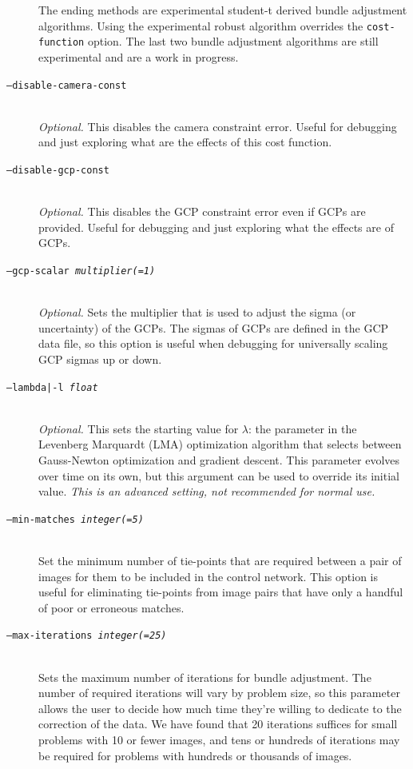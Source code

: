\begin{description}
  The ending methods are experimental student-t derived bundle
  adjustment algorithms. Using the experimental robust algorithm
  overrides the {\tt cost-function} option. The last two bundle
  adjustment algorithms are still experimental and are a work in
  progress.

\item[\texttt{--disable-camera-const}] \hfill \\
  \emph{Optional.} This disables the camera constraint error. Useful
  for debugging and just exploring what are the effects of this cost
  function.

\item[\texttt{--disable-gcp-const}] \hfill \\
  \emph{Optional.} This disables the \ac{GCP} constraint error even
  if \acp{GCP} are provided. Useful for debugging and just exploring
  what the effects are of \acp{GCP}.

\item[\texttt{--gcp-scalar \textit{multiplier(=1)}}] \hfill \\
  \emph{Optional.} Sets the multiplier that is used to adjust the
  sigma (or uncertainty) of the \aclp{GCP}. The sigmas of
  \aclp{GCP} are defined in the \ac{GCP} data file, so this
  option is useful when debugging for universally scaling \ac{GCP} sigmas
  up or down.

\item[\texttt{--lambda|-l \textit{float}}] \hfill \\
  \emph{Optional.} This sets the starting value for $\lambda$: the
  parameter in the Levenberg Marquardt (LMA) optimization algorithm
  that selects between Gauss-Newton optimization and gradient
  descent. This parameter evolves over time on its own, but this
  argument can be used to override its initial value. \emph{This is an
  advanced setting, not recommended for normal use.}

\item[\texttt{--min-matches \textit{integer(=5)}}] \hfill \\
  Set the minimum number of tie-points that are required between a
  pair of images for them to be included in the control network. This
  option is useful for eliminating tie-points from image pairs that
  have only a handful of poor or erroneous matches.

\item[\texttt{--max-iterations \textit{integer(=25)}}] \hfill \\
  Sets the maximum number of iterations for bundle adjustment. The
  number of required iterations will vary by problem size, so this
  parameter allows the user to decide how much time they're willing
  to dedicate to the correction of the data.  We have found that 20
  iterations suffices for small problems with 10 or fewer images, and
  tens or hundreds of iterations may be required for problems with
  hundreds or thousands of images.


\end{description}
